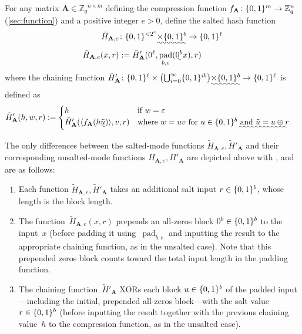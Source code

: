 \documentclass[11pt]{article}
\newcommand{\Z}{\ensuremath{\mathbb{Z}}}
\newcommand{\Zq}{\ensuremath{\Z_q}}
\DeclarePairedDelimiter\inner{\langle}{\rangle}
\DeclarePairedDelimiter\set{\{}{\}}
\DeclarePairedDelimiter\parens{(}{)}
\newcommand{\matA}{\ensuremath{\mathbf{A}}}
\numberwithin{equation}{section}
\newcommand{\bit}{\ensuremath{\set{0,1}}}
\DeclareMathOperator{\pad}{pad}
\begin{document}
For any matrix $\matA \in \Zq^{n \times m}$ defining the compression
function $f_{\matA} \colon \bit^{m} \to \Zq^{n}$ (\cref{sec:function})
and a positive integer $e > 0$, define the salted hash function
\begin{align}
  \label{eq:H-tilde}
  \tilde{H}_{\matA,e} &\colon \bit^{< 2^{e}} \uwave{\times \bit^{b}} \to
                        \bit^{\ell} \nonumber \\
  \tilde{H}_{\matA,e}(x, \uwave{r}) &:= \tilde{H}'_{\matA}(0^{\ell},
                                     \pad_{b,e}(\uwave{0^{b}} x), \uwave{r})
\end{align}
where the chaining function
$\tilde{H}'_{\matA} \colon \bit^{\ell} \times
\parens*{\bigcup_{i=0}^{\infty} \bit^{ib}} \uwave{\times \bit^{b}} \to
\bit^{\ell}$ is defined as
\begin{align}
  \tilde{H}'_{\matA}(h, w, \uwave{r}) &:= \begin{cases}
    h & \text{if } w = \varepsilon \\
    \tilde{H}'_{\matA}(\inner{f_{\matA}(h \uwave{\tilde{u}})},
    v, \uwave{r}) &
    \text{where } w = u v \text{ for } u \in \bit^{b} \uwave{\text{ and }
    \tilde{u} = u \oplus r} \text{.}
  \end{cases}
\end{align}

The only differences between the salted-mode functions
$\tilde{H}_{\matA,e}, \tilde{H}'_{\matA}$ and their corresponding
unsalted-mode functions $H_{\matA,e}, H'_{\matA}$ are depicted above
with , and are as follows:
\begin{enumerate}
\item Each function $\tilde{H}_{\matA,e}, \tilde{H}'_{\matA}$ takes an
  additional salt input $r \in \bit^{b}$, whose length is the block
  length.

\item The function~$\tilde{H}_{\matA,e}(x,r)$ prepends an all-zeros
  block $0^{b} \in \bit^{b}$ to the input~$x$ (before padding it
  using~$\pad_{b,e}$ and inputting the result to the appropriate
  chaining function, as in the unsalted case). Note that this
  prepended zeros block counts toward the total input length in the
  padding function.

\item The chaining function~$\tilde{H}'_{\matA}$ XORs each block
  $u \in \bit^{b}$ of the padded input---including the initial,
  prepended all-zeros block---with the salt value $r \in \bit^{b}$
  (before inputting the result together with the previous chaining
  value~$h$ to the compression function, as in the unsalted case).
\end{enumerate}
\end{document}
